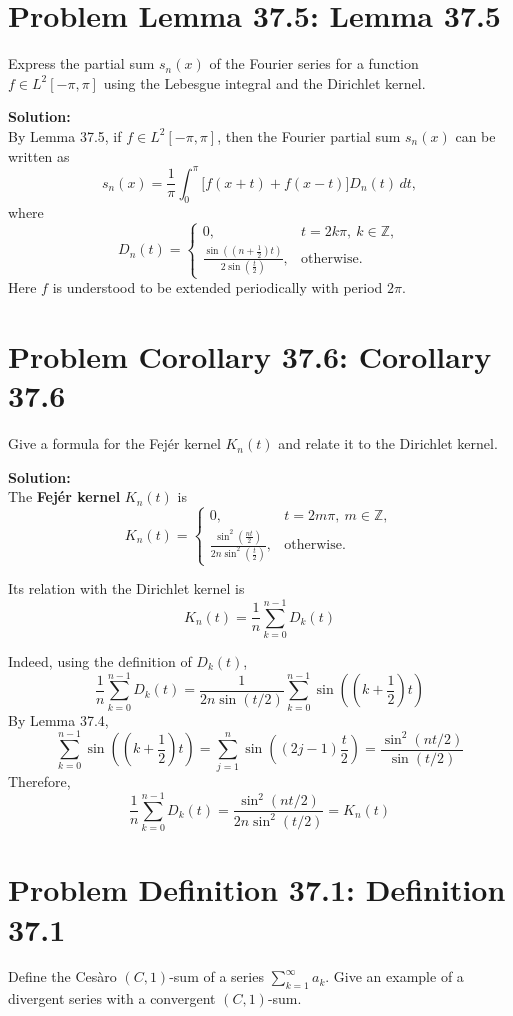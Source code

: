 \documentclass[a4paper]{article}
\theoremstyle{definition}
\newcounter{problem}
\newenvironment{problem}[1][]
{
    \stepcounter{problem}
    \section*{Problem \theproblem\ifx\relax#1\relax\else: #1\fi}
}
{}
\newenvironment{solution}
{
    \noindent\textbf{Solution:}\\
}
{
    
}
\begin{document}
\newpage
\begin{problem}[Lemma 37.5]
Express the partial sum $s_n(x)$ of the Fourier series for a function
$f\in L^2[-\pi,\pi]$ using the Lebesgue integral and the Dirichlet kernel.
\end{problem}

\vspace{2em}
\begin{solution}
By Lemma 37.5, if $f\in L^2[-\pi,\pi]$, then the Fourier partial sum
$s_n(x)$ can be written as
\[
    s_n(x)
    =
    \frac{1}{\pi}\int_0^\pi
    \bigl[f(x+t)+f(x-t)\bigr]D_n(t)\,dt,
\]
where
\[
D_n(t)=
\begin{cases}
0, & t=2k\pi,\ k\in\mathbb{Z},\\[6pt]
\displaystyle
\frac{\sin\left(\left(n+\frac12\right)t\right)}
{2\sin\left(\frac{t}{2}\right)},
& \text{otherwise}.
\end{cases}
\]
Here $f$ is understood to be extended periodically with period $2\pi$.
\end{solution}

\newpage
\begin{problem}[Corollary 37.6]
Give a formula for the Fej\'er kernel $K_n(t)$ and relate it to the Dirichlet kernel.
\end{problem}

\vspace{2em}
\begin{solution}
The \textbf{Fej\'er kernel} $K_n(t)$ is
\[
K_n(t)=
\begin{cases}
0, & t=2m\pi,\ m\in\mathbb{Z},\\[6pt]
\displaystyle
\frac{\sin^2\left(\frac{nt}{2}\right)}
{2n\sin^2\left(\frac{t}{2}\right)},
& \text{otherwise}.
\end{cases}
\]

\vspace{2em}
\noindent Its relation with the Dirichlet kernel is
\[
    K_n(t)=\frac{1}{n}\sum_{k=0}^{n-1}D_k(t)
\]

Indeed, using the definition of $D_k(t)$,
\[
\frac{1}{n}\sum_{k=0}^{n-1}D_k(t)
=
\frac{1}{2n\sin(t/2)}
\sum_{k=0}^{n-1}
\sin\left(\left(k+\frac12\right)t\right)
\]
By Lemma 37.4,
\[
\sum_{k=0}^{n-1}
\sin\left(\left(k+\frac12\right)t\right)
=
\sum_{j=1}^{n}\sin\left((2j-1)\frac{t}{2}\right)
=
\frac{\sin^2(nt/2)}{\sin(t/2)}
\]
Therefore,
\[
\frac{1}{n}\sum_{k=0}^{n-1}D_k(t)
=
\frac{\sin^2(nt/2)}
{2n\sin^2(t/2)}
=
K_n(t)
\]
\end{solution}

\newpage
\begin{problem}[Definition 37.1]
Define the Ces\`aro $(C,1)$-sum of a series $\sum_{k=1}^{\infty} a_k$. 
Give an example of a divergent series with a convergent $(C,1)$-sum.
\end{problem}
\end{document}
